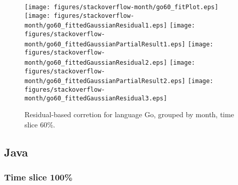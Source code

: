 \begin{figure}[t]
\centering
{}
{\texttt{[image: figures/stackoverflow-month/go60\_fitPlot.eps]}}
{\texttt{[image: figures/stackoverflow-month/go60\_fittedGaussianResidual1.eps]}}
{\texttt{[image: figures/stackoverflow-month/go60\_fittedGaussianPartialResult1.eps]}}
{\texttt{[image: figures/stackoverflow-month/go60\_fittedGaussianResidual2.eps]}}
{\texttt{[image: figures/stackoverflow-month/go60\_fittedGaussianPartialResult2.eps]}}
{\texttt{[image: figures/stackoverflow-month/go60\_fittedGaussianResidual3.eps]}}
\caption{Residual-based corretion for language Go, grouped by month, time slice 60\%.}
\end{figure}


\FloatBarrier


\subsection{Java}

\subsubsection{Time slice 100\%}

